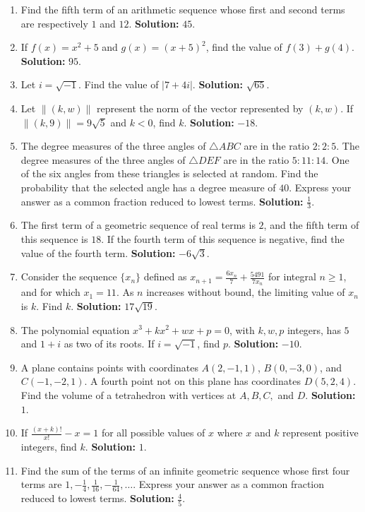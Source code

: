 \documentclass[10pt]{article}
\begin{document}
\begin{enumerate}
\item Find the fifth term of an arithmetic sequence whose first and second terms are respectively $1$ and $12$. \textbf{Solution:} $45$.
\item If $f(x)=x^2+5$ and $g(x)=(x+5)^2$, find the value of $f(3)+g(4)$. \textbf{Solution:} $95$.
\item Let $i=\sqrt{-1}$. Find the value of $|7+4i|$. \textbf{Solution:} $\sqrt{65}$.
\item Let $\|(k,w)\|$ represent the norm of the vector represented by $(k,w)$. If $\|(k,9)\|=9\sqrt{5}$ and $k<0$, find $k$. \textbf{Solution:} $-18$.
\item The degree measures of the three angles of $\triangle ABC$ are in the ratio $2:2:5$. The degree measures of the three angles of $\triangle DEF$ are in the ratio $5:11:14$. One of the six angles from these triangles is selected at random. Find the probability that the selected angle has a degree measure of $40$. Express your answer as a common fraction reduced to lowest terms. \textbf{Solution:} $\frac{1}{3}$.
\item The first term of a geometric sequence of real terms is $2$, and the fifth term of this sequence is $18$. If the fourth term of this sequence is negative, find the value of the fourth term. \textbf{Solution:} $-6\sqrt{3}$.
\item Consider the sequence $\{x_n\}$ defined as $x_{n+1}=\frac{6x_n}{7}+\frac{5491}{7x_n}$ for integral $n\geq 1$, and for which $x_1=11$. As $n$ increases without bound, the limiting value of $x_n$ is $k$. Find $k$. \textbf{Solution:} $17\sqrt{19}$.
\item The polynomial equation $x^3+kx^2+wx+p=0$, with $k,w,p$ integers, has $5$ and $1+i$ as two of its roots. If $i=\sqrt{-1}$, find $p$. \textbf{Solution:} $-10$.
\item A plane contains points with coordinates $A(2,-1,1)$, $B(0,-3,0)$, and $C(-1,-2,1)$. A fourth point not on this plane has coordinates $D(5,2,4)$. Find the volume of a tetrahedron with vertices at $A,B,C,$ and $D$. \textbf{Solution:} $1$.
\item If $\frac{(x+k)!}{x!}-x=1$ for all possible values of $x$ where $x$ and $k$ represent positive integers, find $k$. \textbf{Solution:} $1$.
\item Find the sum of the terms of an infinite geometric sequence whose first four terms are $1,-\frac14,\frac1{16},-\frac1{64},\ldots$. Express your answer as a common fraction reduced to lowest terms. \textbf{Solution:} $\frac45$.

\end{enumerate}
\end{document}
